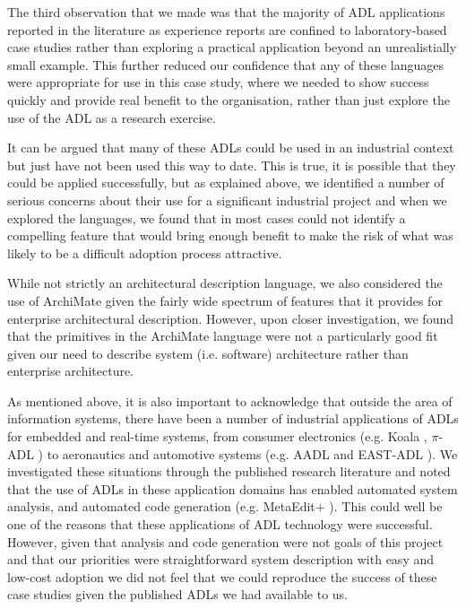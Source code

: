   The third observation that we made was that the majority of ADL applications reported in the literature as experience reports are confined to laboratory-based case studies rather than exploring a practical application beyond an unrealistially small example.  This further reduced our confidence that any of these languages were appropriate for use in this case study, where we needed to show success quickly and provide real benefit to the organisation, rather than just explore the use of the ADL as a research exercise.

  It can be argued that many of these ADLs could be used in an industrial context but just have not been used this way to date.  This is true, it is possible that they could be applied successfully, but as explained above, we identified a number of serious concerns about their use for a significant industrial project and when we explored the languages, we found that in most cases could not identify a compelling feature that would bring enough benefit to make the risk of what was likely to be a difficult adoption process attractive.

  While not strictly an architectural description language, we also considered the use of ArchiMate \cite{lankhorst2009-archimate} given the fairly wide spectrum of features that it provides for enterprise architectural description. However, upon closer investigation, we found that the primitives in the ArchiMate language were not a particularly good fit given our need to describe system (i.e. software) architecture rather than enterprise architecture.

  As mentioned above, it is also important to acknowledge that outside the area of information systems, there have been a number of industrial applications of ADLs for embedded and real-time systems, from consumer electronics (e.g. 
  Koala \cite{vanommering2000-koala}, $\pi$-ADL \cite{oquendo2004-piadl}) to aeronautics and automotive systems (e.g. AADL \cite{sae2009-aadl} and EAST-ADL \cite{cuenot2010-east}). We investigated these situations through the published research literature and noted that the use of ADLs in these application domains has enabled automated system analysis, and automated code generation (e.g. MetaEdit+ \cite{smolander1991-metaedit}). This could well be one of the reasons that these applications of ADL technology were successful.  However, given that analysis and code generation were not goals of this project and that our priorities were straightforward system description with easy and low-cost adoption we did not feel that we could reproduce the success of these case studies given the published ADLs we had available to us.

